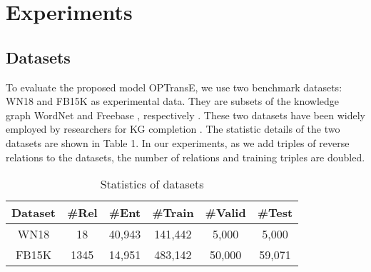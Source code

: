 \documentclass[11pt,a4paper]{article}
\begin{document}
\section{Experiments}

\subsection{Datasets}
To evaluate the proposed model OPTransE, we use two benchmark
datasets: WN18 and FB15K as experimental data. They are subsets of
the knowledge graph WordNet \cite{miller1995wordnet} and Freebase
\cite{bollacker2008freebase}, respectively
\cite{bordes2013translating}. These two datasets have
been widely employed by researchers for KG completion
\cite{jia2018path,lin2018relation}. The statistic details of the two
datasets are shown in Table 1. In our experiments, as we add triples
of reverse relations to the datasets, the number of relations and
training triples are doubled.

\begin{table}[H]\small
\centering \caption{Statistics of datasets}
\begin{tabular}{c|ccccc}
\hline
Dataset & \#Rel & \#Ent & \#Train & \#Valid & \#Test \\
\hline
WN18 & 18 & 40,943 & 141,442 & 5,000 & 5,000 \\
FB15K & 1345 & 14,951 & 483,142 & 50,000 & 59,071 \\
\hline
\end{tabular}
\end{table}
\end{document}
